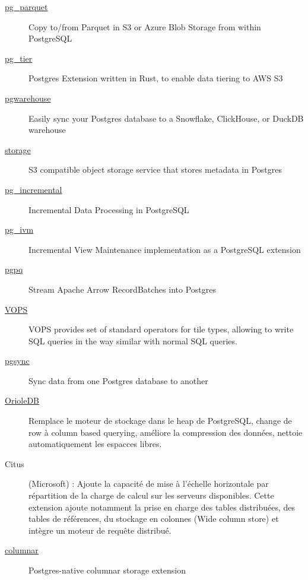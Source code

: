 \documentclass[a4paper,12pt]{article}
\begin{document}
\begin{multicols*}{2}
\begin{description}
\item[{\href{https://github.com/CrunchyData/pg\_parquet}{pg\_parquet}}] Copy to/from Parquet in S3 or Azure Blob Storage from within PostgreSQL
\item[{\href{https://github.com/tembo-io/pg\_tier}{pg\_tier}}] Postgres Extension written in Rust, to enable data tiering to AWS S3
\item[{\href{https://github.com/scottpersinger/pgwarehouse}{pgwarehouse}}] Easily sync your Postgres database to a Snowflake, ClickHouse, or DuckDB warehouse
\item[{\href{https://github.com/supabase/storage}{storage}}] S3 compatible object storage service that stores metadata in Postgres

\item[{\href{https://github.com/crunchydata/pg\_incremental}{pg\_incremental}}] Incremental Data Processing in PostgreSQL
\item[{\href{https://github.com/sraoss/pg\_ivm}{pg\_ivm}}] Incremental View Maintenance implementation as a PostgreSQL extension
\item[{\href{https://github.com/adriangb/pgpq}{pgpq}}] Stream Apache Arrow RecordBatches into Postgres
\item[{\href{https://github.com/postgrespro/vops}{VOPS}}] VOPS provides set of standard operators for tile types, allowing to write SQL queries in the way similar with normal SQL queries.
\item[{\href{https://github.com/ankane/pgsync}{pgsync}}] Sync data from one Postgres database to another
\end{description}

\begin{description}
\item[{\href{https://github.com/orioledb/orioledb}{OrioleDB}}] Remplace le moteur de stockage dans le heap de PostgreSQL, change de row à column based querying, améliore la compression des données, nettoie automatiquement les espacces libres.
\item[{Citus}] (Microsoft) : Ajoute la capacité de mise à l’échelle horizontale par répartition de la charge de calcul sur les serveurs disponibles. Cette extension ajoute notamment la prise en charge des tables distribuées, des tables de références, du stockage en colonnes (Wide column store) et intègre un moteur de requête distribué.
\item[{\href{https://github.com/hydradatabase/columnar}{columnar}}] Postgres-native columnar storage extension
\end{description}

\end{multicols*}
\end{document}
